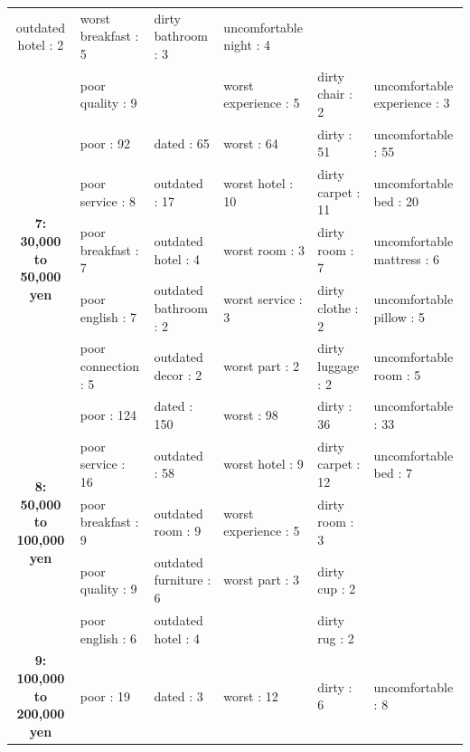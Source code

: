 \documentclass[smallextended,natbib]{svjour3}       %
\begin{document}
\begin{landscape}
\begin{table}[p]
{\begin{tabular}{|c|l|l|l|l|l|}
          outdated hotel : 2 &
          worst breakfast : 5 &
          dirty bathroom : 3 &
          uncomfortable night : 4 \\
         &
          poor quality : 9 &
           &
          worst experience : 5 &
          dirty chair : 2 &
          uncomfortable experience : 3 \\ \hline
        \multirow{5}{*}{\textbf{7: 30,000 to 50,000 yen}} &
          poor : 92 &
          dated : 65 &
          worst : 64 &
          dirty : 51 &
          uncomfortable : 55 \\
         &
          poor service : 8 &
          outdated : 17 &
          worst hotel : 10 &
          dirty carpet : 11 &
          uncomfortable bed : 20 \\
         &
          poor breakfast : 7 &
          outdated hotel : 4 &
          worst room : 3 &
          dirty room : 7 &
          uncomfortable mattress : 6 \\
         &
          poor english : 7 &
          outdated bathroom : 2 &
          worst service : 3 &
          dirty clothe : 2 &
          uncomfortable pillow : 5 \\
         &
          poor connection : 5 &
          outdated decor : 2 &
          worst part : 2 &
          dirty luggage : 2 &
          uncomfortable room : 5 \\ \hline
        \multirow{5}{*}{\textbf{8: 50,000 to 100,000 yen}} &
          poor : 124 &
          dated : 150 &
          worst : 98 &
          dirty : 36 &
          uncomfortable : 33 \\
         &
          poor service : 16 &
          outdated : 58 &
          worst hotel : 9 &
          dirty carpet : 12 &
          uncomfortable bed : 7 \\
         &
          poor breakfast : 9 &
          outdated room : 9 &
          worst experience : 5 &
          dirty room : 3 &
           \\
         &
          poor quality : 9 &
          outdated furniture : 6 &
          worst part : 3 &
          dirty cup : 2 &
           \\
         &
          poor english : 6 &
          outdated hotel : 4 &
           &
          dirty rug : 2 &
           \\ \hline
        \multirow{5}{*}{\textbf{9: 100,000 to 200,000 yen}} &
          poor : 19 &
          dated : 3 &
          worst : 12 &
          dirty : 6 &
          uncomfortable : 8 \\

\end{tabular}}
\end{table}
\end{landscape}
\end{document}
